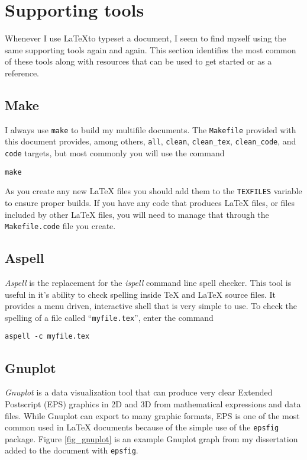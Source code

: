 \section{Supporting tools}

Whenever I use \LaTeX to typeset a document, I seem to find myself using the same supporting tools
again and again.  This section identifies the most common of these tools
along with resources that can be used to get started or as a reference.

\subsection{Make}
I always use {\tt make} to build my multifile documents.
The {\tt Makefile} provided with this document provides, among
others, {\tt all}, {\tt clean}, {\tt clean\_tex}, {\tt clean\_code}, and {\tt code}
targets, but most commonly you will use the command
\begin{center}
{\tt make}
\end{center}

As you create any new \LaTeX{} files you should add them to the {\tt TEXFILES} variable
to ensure proper builds.  If you have any code that produces \LaTeX{} files, or files 
included by other \LaTeX{} files, you will need to manage that through the 
{\tt Makefile.code} file you create.

\subsection{Aspell}

\emph{Aspell} is the replacement for the \emph{ispell} command line spell checker.  
This tool is useful in it's ability to check spelling inside \TeX{} and \LaTeX{}
source files.  It provides a menu driven, interactive shell that is very simple to use.
To check the spelling of a file called ``{\tt myfile.tex}'', enter the command
\begin{center}
{\tt aspell -c myfile.tex}
\end{center}

\subsection{Gnuplot}

\emph{Gnuplot} is a data visualization tool that can produce very clear Extended Postscript (EPS)
graphics in 2D and 3D from mathematical expressions and data files.  While Gnuplot can export 
to many graphic formats, EPS is one of the most common used in \LaTeX{} documents because
of the simple use of the {\tt epsfig} package.  Figure \ref{fig_gnuplot} 
is an example Gnuplot graph from my dissertation added to the document with {\tt epsfig}.  

